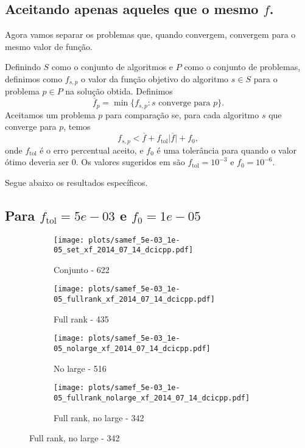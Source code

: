 \documentclass{article}
\newcommand{\ftol}{f_{\mbox{tol}}}
\begin{document}
\subsection{Aceitando apenas aqueles que o mesmo $f$. }

Agora vamos separar os problemas que, quando convergem, convergem para o mesmo
valor de função.

Definindo $S$ como o conjunto de algoritmos e $P$ como o conjunto de problemas,
definimos como $f_{s,p}$ o valor da função objetivo do algoritmo $s \in S$ para
o problema $p \in P$ na solução obtida.
Definimos
$$ \overline{f}_{p} = \min\{f_{s,p} : s \mbox{ converge para } p\}. $$
Aceitamos um problema $p$ para comparação se, para cada algoritmo $s$ que
converge para $p$, temos
$$ f_{s,p} < \overline{f} + \ftol\vert\overline{f}\vert + f_0, $$
onde $\ftol$ é o erro percentual aceito, e $f_0$ é uma tolerância para quando o
valor ótimo deveria ser $0$.
Os valores sugeridos em \cite{bib:compare-optimal-values} são $\ftol=10^{-3}$ e
$f_0 = 10^{-6}$.

Segue abaixo os resultados específicos.

\subsection{Para $\ftol = 5e-03$ e $f_0 = 1e-05$}

\begin{figure}[H]
  \centering
  \begin{subfigure}{0.48\textwidth}
    \texttt{[image: plots/samef\_5e-03\_1e-05\_set\_xf\_2014\_07\_14\_dcicpp.pdf]}
    \caption{Conjunto - 622}
  \end{subfigure}
  \begin{subfigure}{0.48\textwidth}
    \texttt{[image: plots/samef\_5e-03\_1e-05\_fullrank\_xf\_2014\_07\_14\_dcicpp.pdf]}
    \caption{Full rank - 435}
  \end{subfigure}
  \begin{subfigure}{0.48\textwidth}
    \texttt{[image: plots/samef\_5e-03\_1e-05\_nolarge\_xf\_2014\_07\_14\_dcicpp.pdf]}
    \caption{No large - 516}
  \end{subfigure}
  \begin{subfigure}{0.48\textwidth}
    \texttt{[image: plots/samef\_5e-03\_1e-05\_fullrank\_nolarge\_xf\_2014\_07\_14\_dcicpp.pdf]}
    \caption{Full rank, no large - 342}
  \end{subfigure}
\end{figure}
\end{document}
